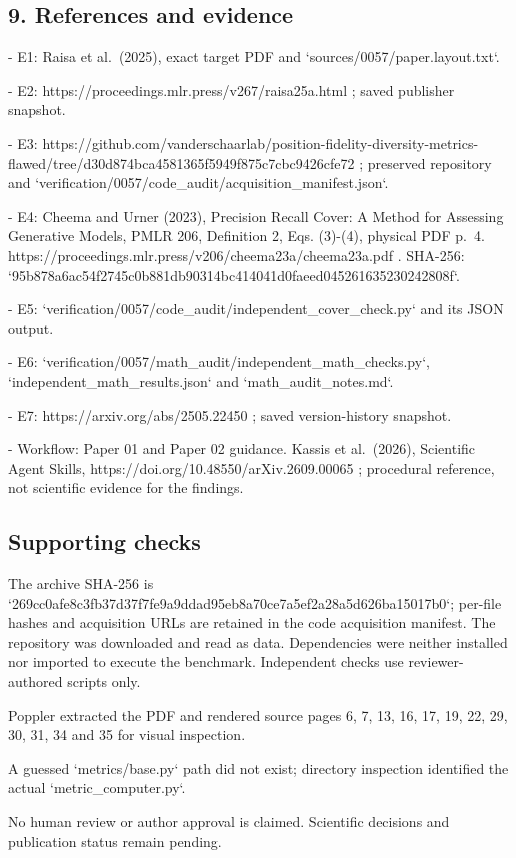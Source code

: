 \documentclass[10pt]{article}
\begin{document}
\subsection*{9. References and evidence}
- E1: Raisa et al. (2025), exact target PDF and `sources/0057/paper.layout.txt`.\par
- E2: https://proceedings.mlr.press/v267/raisa25a.html ; saved publisher snapshot.\par
- E3: https://github.com/vanderschaarlab/position-fidelity-diversity-metrics-flawed/tree/d30d874bca4581365f5949f875c7cbc9426cfe72 ; preserved repository and `verification/0057/code\_audit/acquisition\_manifest.json`.\par
- E4: Cheema and Urner (2023), Precision Recall Cover: A Method for Assessing Generative Models, PMLR 206, Definition 2, Eqs. (3)-(4), physical PDF p. 4. https://proceedings.mlr.press/v206/cheema23a/cheema23a.pdf . SHA-256: `95b878a6ac54f2745c0b881db90314bc414041d0faeed045261635230242808f`.\par
- E5: `verification/0057/code\_audit/independent\_cover\_check.py` and its JSON output.\par
- E6: `verification/0057/math\_audit/independent\_math\_checks.py`, `independent\_math\_results.json` and `math\_audit\_notes.md`.\par
- E7: https://arxiv.org/abs/2505.22450 ; saved version-history snapshot.\par
- Workflow: Paper 01 and Paper 02 guidance. Kassis et al. (2026), Scientific Agent Skills, https://doi.org/10.48550/arXiv.2609.00065 ; procedural reference, not scientific evidence for the findings.\par
\subsection*{Supporting checks}
The archive SHA-256 is `269cc0afe8c3fb37d37f7fe9a9ddad95eb8a70ce7a5ef2a28a5d626ba15017b0`; per-file hashes and acquisition URLs are retained in the code acquisition manifest. The repository was downloaded and read as data. Dependencies were neither installed nor imported to execute the benchmark. Independent checks use reviewer-authored scripts only.\par
Poppler extracted the PDF and rendered source pages 6, 7, 13, 16, 17, 19, 22, 29, 30, 31, 34 and 35 for visual inspection.\par
A guessed `metrics/base.py` path did not exist; directory inspection identified the actual `metric\_computer.py`.\par
No human review or author approval is claimed. Scientific decisions and publication status remain pending.\par
\end{document}
